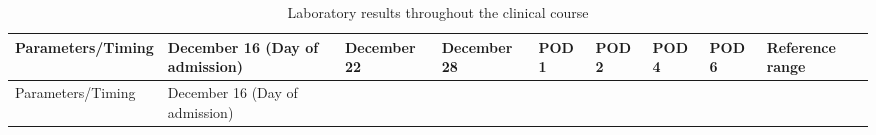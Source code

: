 \documentclass[
  letterpaper,
  DIV=11,
  numbers=noendperiod]{scrartcl}
\begin{document}
\begin{longtable}[]{@{}
  >{\raggedright\arraybackslash}p{}
  >{\raggedright\arraybackslash}p{}
  >{\raggedright\arraybackslash}p{}
  >{\raggedright\arraybackslash}p{}
  >{\raggedright\arraybackslash}p{}
  >{\raggedright\arraybackslash}p{}
  >{\raggedright\arraybackslash}p{}
  >{\raggedright\arraybackslash}p{}
  >{\raggedright\arraybackslash}p{}@{}}
\caption{Laboratory results throughout the clinical
course}\tabularnewline
\toprule\noalign{}
\begin{minipage}[b]{\linewidth}\raggedright
Parameters/Timing
\end{minipage} & \begin{minipage}[b]{\linewidth}\raggedright
December 16 (Day of admission)
\end{minipage} & \begin{minipage}[b]{\linewidth}\raggedright
December 22
\end{minipage} & \begin{minipage}[b]{\linewidth}\raggedright
December 28
\end{minipage} & \begin{minipage}[b]{\linewidth}\raggedright
POD 1
\end{minipage} & \begin{minipage}[b]{\linewidth}\raggedright
POD 2
\end{minipage} & \begin{minipage}[b]{\linewidth}\raggedright
POD 4
\end{minipage} & \begin{minipage}[b]{\linewidth}\raggedright
POD 6
\end{minipage} & \begin{minipage}[b]{\linewidth}\raggedright
Reference range
\end{minipage} \\
\midrule\noalign{}
\endfirsthead
\toprule\noalign{}
\begin{minipage}[b]{\linewidth}\raggedright
Parameters/Timing
\end{minipage} & \begin{minipage}[b]{\linewidth}\raggedright
December 16 (Day of admission)

\end{minipage}
\end{longtable}
\end{document}
